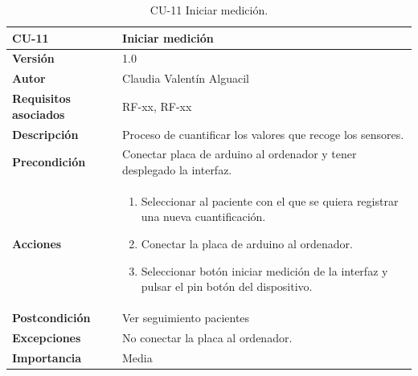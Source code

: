 \begin{table}[p]
	\centering
	\begin{tabularx}{\linewidth}{ p{} p{} }
		\toprule
		\textbf{CU-11}    & \textbf{Iniciar medición}\\
		\toprule
		\textbf{Versión}              & 1.0    \\
		\textbf{Autor}                & Claudia Valentín Alguacil \\
		\textbf{Requisitos asociados} & RF-xx, RF-xx \\
		\textbf{Descripción}          & Proceso de cuantificar los valores que recoge los sensores. \\
		\textbf{Precondición}         & Conectar placa de arduino al ordenador y tener desplegado la interfaz. \\
		\textbf{Acciones}             &
		\begin{enumerate}
			\def\labelenumi{\arabic{enumi}.}
			\tightlist
			\item Seleccionar al paciente con el que se quiera registrar una nueva cuantificación.
			\item Conectar la placa de arduino al ordenador.
                \item Seleccionar botón iniciar medición de la interfaz y pulsar el pin botón del dispositivo.
		\end{enumerate}\\
		\textbf{Postcondición}        &  Ver seguimiento pacientes\\
		\textbf{Excepciones}          & No conectar la placa al ordenador. \\
		\textbf{Importancia}          & Media \\
		\bottomrule
	\end{tabularx}
	\caption{CU-11 Iniciar medición.}
\end{table}

